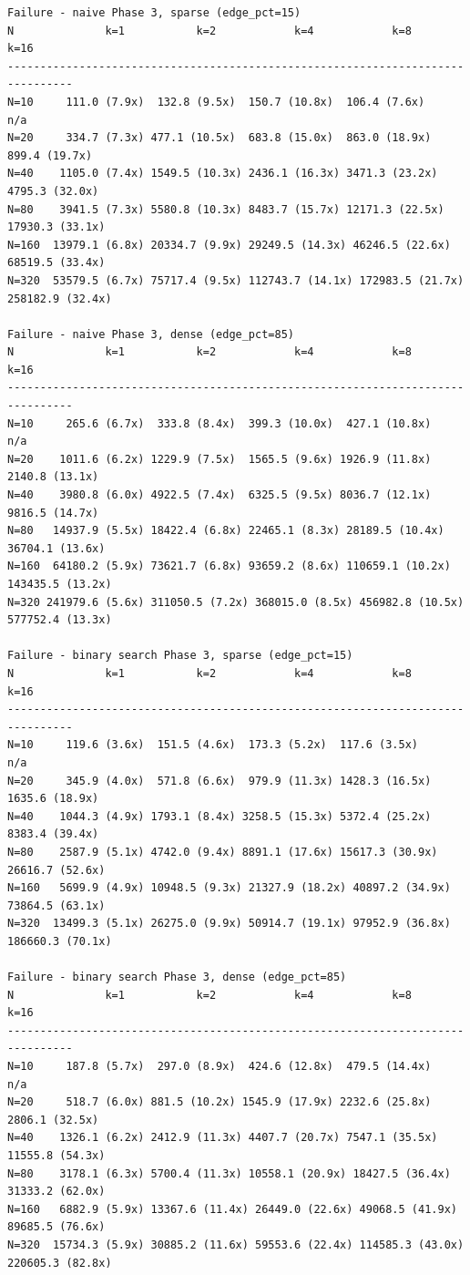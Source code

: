 {\footnotesize
\begin{verbatim}
Failure - naive Phase 3, sparse (edge_pct=15)
N              k=1           k=2            k=4            k=8            k=16
--------------------------------------------------------------------------------
N=10     111.0 (7.9x)  132.8 (9.5x)  150.7 (10.8x)  106.4 (7.6x)              n/a
N=20     334.7 (7.3x) 477.1 (10.5x)  683.8 (15.0x)  863.0 (18.9x)  899.4 (19.7x)
N=40    1105.0 (7.4x) 1549.5 (10.3x) 2436.1 (16.3x) 3471.3 (23.2x) 4795.3 (32.0x)
N=80    3941.5 (7.3x) 5580.8 (10.3x) 8483.7 (15.7x) 12171.3 (22.5x) 17930.3 (33.1x)
N=160  13979.1 (6.8x) 20334.7 (9.9x) 29249.5 (14.3x) 46246.5 (22.6x) 68519.5 (33.4x)
N=320  53579.5 (6.7x) 75717.4 (9.5x) 112743.7 (14.1x) 172983.5 (21.7x) 258182.9 (32.4x)

Failure - naive Phase 3, dense (edge_pct=85)
N              k=1           k=2            k=4            k=8            k=16
--------------------------------------------------------------------------------
N=10     265.6 (6.7x)  333.8 (8.4x)  399.3 (10.0x)  427.1 (10.8x)             n/a
N=20    1011.6 (6.2x) 1229.9 (7.5x)  1565.5 (9.6x) 1926.9 (11.8x) 2140.8 (13.1x)
N=40    3980.8 (6.0x) 4922.5 (7.4x)  6325.5 (9.5x) 8036.7 (12.1x) 9816.5 (14.7x)
N=80   14937.9 (5.5x) 18422.4 (6.8x) 22465.1 (8.3x) 28189.5 (10.4x) 36704.1 (13.6x)
N=160  64180.2 (5.9x) 73621.7 (6.8x) 93659.2 (8.6x) 110659.1 (10.2x) 143435.5 (13.2x)
N=320 241979.6 (5.6x) 311050.5 (7.2x) 368015.0 (8.5x) 456982.8 (10.5x) 577752.4 (13.3x)

Failure - binary search Phase 3, sparse (edge_pct=15)
N              k=1           k=2            k=4            k=8            k=16
--------------------------------------------------------------------------------
N=10     119.6 (3.6x)  151.5 (4.6x)  173.3 (5.2x)  117.6 (3.5x)              n/a
N=20     345.9 (4.0x)  571.8 (6.6x)  979.9 (11.3x) 1428.3 (16.5x) 1635.6 (18.9x)
N=40    1044.3 (4.9x) 1793.1 (8.4x) 3258.5 (15.3x) 5372.4 (25.2x) 8383.4 (39.4x)
N=80    2587.9 (5.1x) 4742.0 (9.4x) 8891.1 (17.6x) 15617.3 (30.9x) 26616.7 (52.6x)
N=160   5699.9 (4.9x) 10948.5 (9.3x) 21327.9 (18.2x) 40897.2 (34.9x) 73864.5 (63.1x)
N=320  13499.3 (5.1x) 26275.0 (9.9x) 50914.7 (19.1x) 97952.9 (36.8x) 186660.3 (70.1x)

Failure - binary search Phase 3, dense (edge_pct=85)
N              k=1           k=2            k=4            k=8            k=16
--------------------------------------------------------------------------------
N=10     187.8 (5.7x)  297.0 (8.9x)  424.6 (12.8x)  479.5 (14.4x)             n/a
N=20     518.7 (6.0x) 881.5 (10.2x) 1545.9 (17.9x) 2232.6 (25.8x) 2806.1 (32.5x)
N=40    1326.1 (6.2x) 2412.9 (11.3x) 4407.7 (20.7x) 7547.1 (35.5x) 11555.8 (54.3x)
N=80    3178.1 (6.3x) 5700.4 (11.3x) 10558.1 (20.9x) 18427.5 (36.4x) 31333.2 (62.0x)
N=160   6882.9 (5.9x) 13367.6 (11.4x) 26449.0 (22.6x) 49068.5 (41.9x) 89685.5 (76.6x)
N=320  15734.3 (5.9x) 30885.2 (11.6x) 59553.6 (22.4x) 114585.3 (43.0x) 220605.3 (82.8x)


\end{verbatim}}
